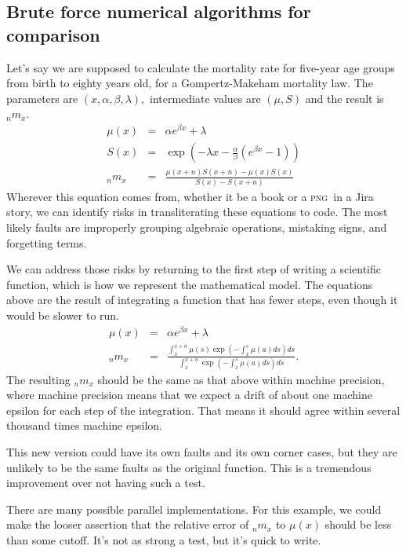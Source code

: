 \documentclass[fleqn,10pt]{olplainarticle}
\begin{document}
\subsection{Brute force numerical algorithms for comparison}

Let's say we are supposed to calculate the mortality rate
for five-year age groups from birth to eighty years old,
for a Gompertz-Makeham mortality law. The parameters are
$(x, \alpha, \beta, \lambda),$ intermediate values are $(\mu, S)$ and the result is ${}_nm_x$.
\begin{eqnarray}
  \mu(x) & =&  \alpha e^{\beta x} + \lambda \\
  S(x) & = & \exp\left(-\lambda x - \frac{\alpha}{\beta}\left(e^{\beta x} - 1\right)\right) \\
  {}_nm_x & = & \frac{\mu(x+n) S(x+n) - \mu(x)S(x)}{S(x) - S(x+n)}
\end{eqnarray}
Wherever this equation comes from, whether it be a book or a
\textsc{png}\ in a Jira story, we can identify risks in transliterating
these equations to code. The most likely faults are improperly grouping
algebraic operations, mistaking signs, and forgetting terms. 

We can address those risks by returning to the first step of writing
a scientific function, which is how we represent the mathematical model.
The equations above are the result of integrating a function that has fewer
steps, even though it would be slower to run.
\begin{eqnarray}
  \mu(x) & =&  \alpha e^{\beta x} + \lambda \\
  {}_nm_x & = &\frac{\int_{x}^{x+n}\mu(s) \exp(-\int_{x}^s\mu(a)ds)ds}{\int_{x}^{x+n}\exp(-\int_{x}^s\mu(a)ds)ds}.
\end{eqnarray}
The resulting ${}_nm_x$ should be the same as that above within
machine precision, where machine precision means that we expect a drift
of about one machine epsilon for each step of the integration. That means
it should agree within several thousand times machine epsilon.

This new version could have its own faults and its
own corner cases, but they are unlikely to be the same faults
as the original function. This is a tremendous improvement over
not having such a test.

There are many possible parallel implementations. For this example,
we could make the looser assertion that the relative error of ${}_nm_x$
to $\mu(x)$ should be less than some cutoff. It's not as strong a test,
but it's quick to write.
\end{document}

